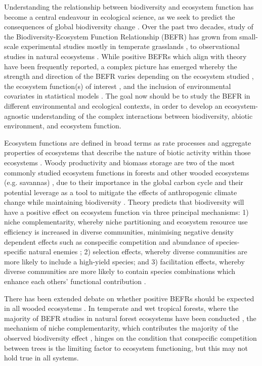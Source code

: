 \documentclass[12pt,a4paper]{article}
\begin{document}
Understanding the relationship between biodiversity and ecosystem function has become a central endeavour in ecological science, as we seek to predict the consequences of global biodiversity change \citep{Naeem2012}. Over the past two decades, study of the Biodiversity-Ecosystem Function Relationship (BEFR) has grown from small-scale experimental studies mostly in temperate grasslands \citep{Cardinale2009, Tilman1994, Tilman2014}, to observational studies in natural ecosystems \citep{Plas2019}. While positive BEFRs which align with theory have been frequently reported, a complex picture has emerged whereby the strength and direction of the BEFR varies depending on the ecosystem studied \citep{Liang2016}, the ecosystem function(s) of interest \citep{Hector2007}, and the inclusion of environmental covariates in statistical models \citep{Vila2005}. The goal now should be to study the BEFR in different environmental and ecological contexts, in order to develop an ecosystem-agnostic understanding of the complex interactions between biodiversity, abiotic environment, and ecosystem function.

Ecosystem functions are defined in broad terms as rate processes and aggregate properties of ecosystems that describe the nature of biotic activity within those ecosystems \citep{Jax2005}. Woody productivity and biomass storage are two of the most commonly studied ecosystem functions in forests and other wooded ecosystems (e.g. savannas) \citep{Brockerhoff2017}, due to their importance in the global carbon cycle \citep{Pan2011} and their potential leverage as a tool to mitigate the effects of anthropogenic climate change while maintaining biodiversity \citep{Pichancourt2013}. Theory predicts that biodiversity will have a positive effect on ecosystem function via three principal mechanisms: 1) niche complementarity, whereby niche partitioning and ecosystem resource use efficiency is increased in diverse communities, minimising negative density dependent effects such as conspecific competition and abundance of species-specific natural enemies \citep{Barry2019}; 2) selection effects, whereby diverse communities are more likely to include a high-yield species; and 3) facilitation effects, whereby diverse communities are more likely to contain species combinations which enhance each others' functional contribution \citep{Wright2017}. 

There has been extended debate on whether positive BEFRs should be expected in all wooded ecosystems \citep{Liang2016}. In temperate and wet tropical forests, where the majority of BEFR studies in natural forest ecosystems have been conducted \citep{Plas2019}, the mechanism of niche complementarity, which contributes the majority of the observed biodiversity effect \citep{Poorter2015, Sande2017a, Wright2017}, hinges on the condition that conspecific competition between trees is the limiting factor to ecosystem functioning, but this may not hold true in all systems. 
\end{document}
